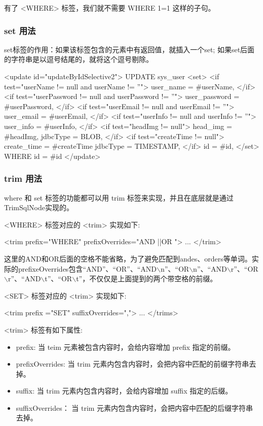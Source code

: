 有了 <WHERE> 标签，我们就不需要 WHERE 1=1 这样的子句。

\subsubsection*{set 用法}

set标签的作用：如果该标签包含的元素中有返回值，就插入一个set; 如果set后面的字符串是以逗号结尾的，就将这个逗号剔除。

\begin{xml}
<update id="updateByIdSelective2">
    UPDATE sys_user
    <set>
        <if test="userName != null and userName != ''">
            user_name = #{userName},
        </if>
        <if test="userPassword != null and userPassword != ''">
            user_password = #{userPassword},
        </if>
        <if test="userEmail != null and userEmail != ''">
            user_email = #{userEmail},
        </if>
        <if test="userInfo != null and userInfo != ''">
            user_info = #{userInfo},
        </if>
        <if test="headImg != null">
            head_img = #{headImg, jdbcType = BLOB},
        </if>
        <if test="createTime != null">
            create_time = #{createTime jdbcType = TIMESTAMP},
        </if>
        id = #{id},
    </set>
    WHERE id = #{id}
</update>
\end{xml}

\subsubsection*{trim 用法}

where 和 set 标签的功能都可以用 trim 标签来实现，并且在底层就是通过TrimSqlNode实现的。

<WHERE> 标签对应的 <trim> 实现如下:
\begin{xml}
<trim prefix="WHERE" prefixOverrides="AND ||OR ">
...
</trim>
\end{xml}

这里的AND和OR后面的空格不能省略，为了避免匹配到andes、orders等单词。实际的prefixeOverrides包含“AND”、“OR”、“AND$\backslash$n”、“OR$\backslash$n”、“AND$\backslash$r”、“OR$\backslash$r”、“AND$\backslash$t”、“OR$\backslash$t”，不仅仅是上面提到的两个带空格的前缀。

<SET> 标签对应的 <trim> 实现如下:

\begin{xml}
<trim prefix ="SET" suffixOverrides=",">
...
</trims>
\end{xml}

<trim> 标签有如下属性:
\begin{itemize}
    \item prefix: 当 teim 元素被包含内容时，会给内容增加 prefix 指定的前缀。
    \item prefixOverrides: 当 trim 元素内包含内容时，会把内容中匹配的前缀字符串去掉。
    \item suffix: 当 trim 元素内包含内容时，会给内容增加 suffix 指定的后缀。
    \item suffixOverrides： 当 trim 元素内包含内容时，会把内容中匹配的后缀字符串去掉。
\end{itemize}

